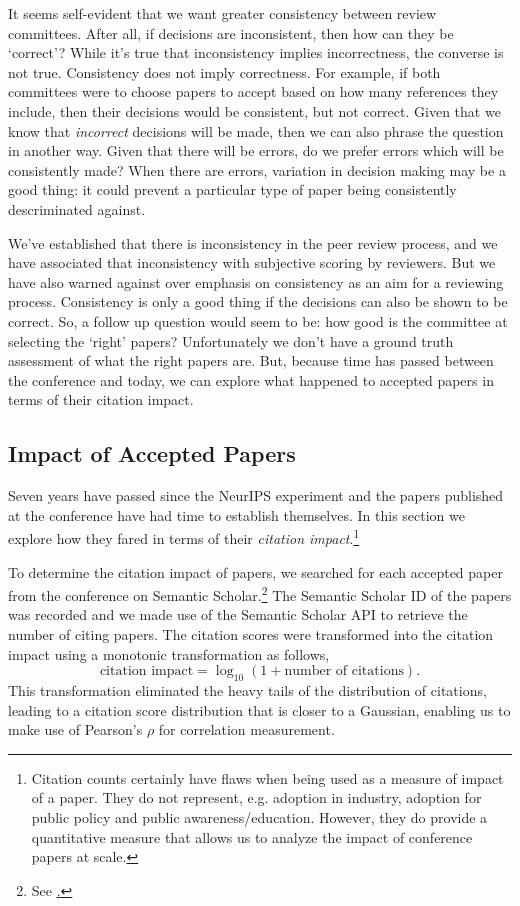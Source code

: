 \documentclass[twoside]{article}
\begin{document}
It seems self-evident that we want greater consistency between review committees. After all, if decisions are inconsistent, then how can they be `correct'? While it's true that inconsistency implies incorrectness, the converse is not true. Consistency does not imply correctness. For example, if both committees were to choose papers to accept based on how many references they include, then their decisions would be consistent, but not correct. Given that we know that \emph{incorrect} decisions will be made, then we can also phrase the question in another way. Given that there will be errors, do we prefer errors which will be consistently made? When there are errors, variation in decision making may be a good thing: it could prevent a particular type of paper being consistently descriminated against.

We've established that there is inconsistency in the peer review process, and we have associated that inconsistency with subjective scoring by reviewers. But we have also warned against over emphasis on consistency as an aim for a reviewing process. Consistency is only a good thing if the decisions can also be shown to be correct. So, a follow up question would seem to be: how good is the committee at selecting the `right' papers? Unfortunately we don't have a ground truth assessment of what the right papers are. But, because time has passed between the conference and today, we can explore what happened to accepted papers in terms of their citation impact. 

\subsection{Impact of Accepted Papers}

Seven years have passed since the NeurIPS experiment and the papers published at the conference have had time to establish themselves. In this section we explore how they fared in terms of their \emph{citation impact}.\footnote{Citation counts certainly have flaws when being used as a measure of impact of a paper. They do not represent, e.g. adoption in industry, adoption for public policy and public awareness/education. However, they do provide a quantitative measure that allows us to analyze the impact of conference papers at scale.}

To determine the citation impact of papers, we searched for each accepted paper from the conference on Semantic Scholar.\footnote{See \href{https://www.semanticscholar.org/about}.} The Semantic Scholar ID of the papers was recorded and we made use of the Semantic Scholar API to retrieve the number of citing papers. The citation scores were transformed into the citation impact using a monotonic transformation as follows,
$$
\text{citation impact} = \log_{10} (1 + \text{number of citations}).
$$
This transformation eliminated the heavy tails of the distribution of citations, leading to a citation score distribution that is closer to a Gaussian, enabling us to make use of Pearson's $\rho$ for correlation measurement.
\end{document}
